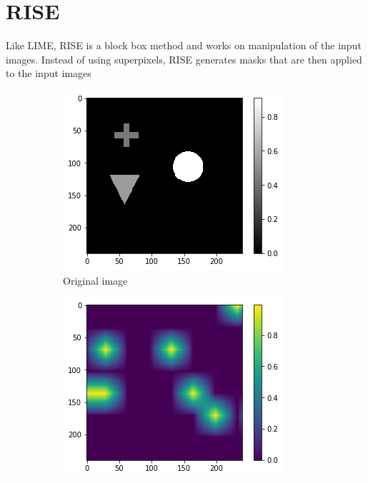 \section{RISE}
Like LIME, RISE is a block box method and works on manipulation of the input images. Instead of using superpixels, RISE generates masks that are then applied to the input images

\begin{figure}[H]
    \centering
    \begin{subfigure}[t]{.32\textwidth}
        \centering
        \includegraphics[width=\linewidth]{chapters/02_methods/images/rise/rise_original.png}
        \caption{Original image}
    \end{subfigure}\hfill%
    \begin{subfigure}[t]{.32\textwidth}
        \centering
        \includegraphics[width=\linewidth]{chapters/02_methods/images/rise/rise0_mask.png}

\end{subfigure}
\end{figure}
